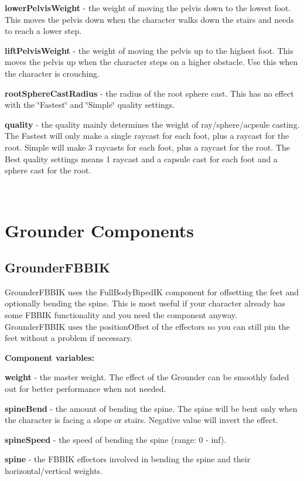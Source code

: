 \begin{DoxyItemize}
\item {\bfseries lower\+Pelvis\+Weight} -\/ the weight of moving the pelvis down to the lowest foot. This moves the pelvis down when the character walks down the stairs and needs to reach a lower step.
\item {\bfseries lift\+Pelvis\+Weight} -\/ the weight of moving the pelvis up to the highest foot. This moves the pelvis up when the character steps on a higher obstacle. Use this when the character is crouching.
\item {\bfseries root\+Sphere\+Cast\+Radius} -\/ the radius of the root sphere cast. This has no effect with the \char`\"{}\+Fastest\char`\"{} and \char`\"{}\+Simple\char`\"{} quality settings.
\item {\bfseries quality} -\/ the quality mainly determines the weight of ray/sphere/acpsule casting. The Fastest will only make a single raycast for each foot, plus a raycast for the root. Simple will make 3 raycasts for each foot, plus a raycast for the root. The Best quality settings means 1 raycast and a capsule cast for each foot and a sphere cast for the root.
\end{DoxyItemize}

~\newline
 \hypertarget{page11_grounders}{}\section{Grounder Components}\label{page11_grounders}
\hypertarget{page11_fbbik}{}\subsection{Grounder\+F\+B\+B\+IK}\label{page11_fbbik}
Grounder\+F\+B\+B\+IK uses the Full\+Body\+Biped\+IK component for offsetting the feet and optionally bending the spine. This is most useful if your character already has some F\+B\+B\+IK functionality and you need the component anyway. Grounder\+F\+B\+B\+IK uses the position\+Offset of the effectors so you can still pin the feet without a problem if necessary.

{\bfseries Component variables\+:}
\begin{DoxyItemize}
\item {\bfseries weight} -\/ the master weight. The effect of the Grounder can be smoothly faded out for better performance when not needed.
\item {\bfseries spine\+Bend} -\/ the amount of bending the spine. The spine will be bent only when the character is facing a slope or stairs. Negative value will invert the effect.
\item {\bfseries spine\+Speed} -\/ the speed of bending the spine (range\+: 0 -\/ inf).
\item {\bfseries spine} -\/ the F\+B\+B\+IK effectors involved in bending the spine and their horizontal/vertical weights.
\end{DoxyItemize}

